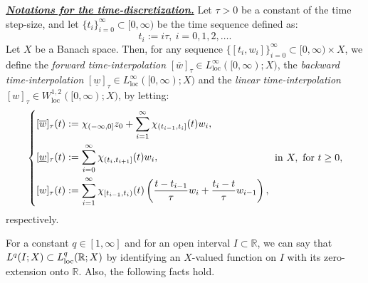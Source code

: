 \documentclass{sinst}
\numberwithin{equation}{section}
\theoremstyle{plain}
\theoremstyle{definition}
\def\R{\mathbb{R}}
\begin{document}
\noindent
\underline{\textbf{\textit{Notations for the time-discretization.}}}
Let $\tau > 0$ be a constant of the time step-size, and let $\{ t_i \}_{i=0}^\infty \subset [0,\infty)$ be the time sequence defined as:
\begin{equation*}
  t_i := i\tau,\ i=0,1,2,\ldots.
\end{equation*}
Let $X$ be a Banach space. Then, for any sequence $\{ [t_i,w_i] \}_{i=0}^\infty \subset[0,\infty) \times X$, we define the \textit{forward time-interpolation} $[\overline{w}]_\tau \in L^\infty_\mathrm{loc}([0,\infty); X)$, the \textit{backward time-interpolation} $[\underline{w}]_\tau \in L^\infty_\mathrm{loc}([0,\infty);X)$ and the \textit{linear time-interpolation} $[w]_\tau \in W^{1,2}_\mathrm{loc}([0,\infty);X)$, by letting:
\begin{equation*}
  \left\{\begin{aligned}
    &[\overline{w}]_\tau(t) := \chi_{(-\infty,0]} z_0 + \sum_{i=1}^\infty \chi_{(t_{i-1}, t_i]}(t) w_i, \\
    &[\underline{w}]_\tau(t) := \sum_{i=0}^\infty \chi_{(t_{i}, t_{i+1}]}(t) w_{i}, \\
    &[w]_\tau (t) := \sum_{i=1}^\infty \chi_{[t_{i-1},t_i)}(t) \left(\frac{t-t_{i-1}}{\tau} w_{i} + \frac{t_i - t}{\tau} w_{i-1}\right),
  \end{aligned}\right. ~{\rm in}~ X,\ {\rm for}~ t \geq 0, \label{eq:tI}
\end{equation*}
respectively.

For a constant $q \in [1 ,\infty]$ and for an open interval $I \subset \R$, we can say that $L^q(I;X) \subset L_{\rm loc}^q(\R;X)$ by identifying an $X$-valued function on $I$ with its zero-extension onto $\R$. Also, the following facts hold.
\smallskip
\end{document}
